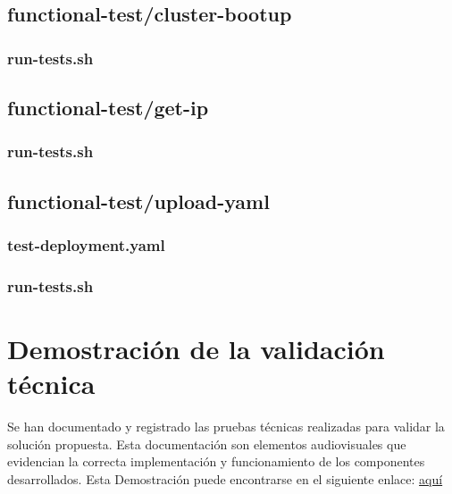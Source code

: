 \subsection{functional-test/cluster-bootup}
\noindent

\subsubsection{run-tests.sh}
\noindent




\subsection{functional-test/get-ip}
\noindent

\subsubsection{run-tests.sh}
\noindent





\subsection{functional-test/upload-yaml}\label{sec:functional-test-upload-yaml}

\subsubsection{test-deployment.yaml}
\noindent



\subsubsection{run-tests.sh}
\noindent



\section{Demostración de la validación técnica}
\noindent
Se han documentado y registrado las pruebas técnicas realizadas para validar la solución propuesta. Esta documentación son elementos audiovisuales que evidencian la correcta implementación y funcionamiento de los componentes desarrollados. Esta Demostración puede encontrarse en el siguiente enlace: \href{https://drive.google.com/drive/folders/1UgpmFmz7E2uYxv_FCGCpYArZDIMc0nxv?usp=sharing}{aquí}


